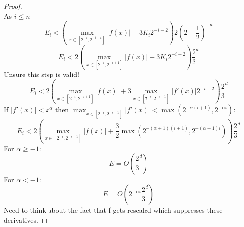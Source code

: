 \documentclass[aps]{revtex4-2}
\begin{document}
\begin{proof}
\begin{equation}
    \end{equation}
    As $i \leq n$
    \begin{equation}
        E_i < \left(\max_{x \in [2^{-i}, 2^{-i+1}]} |f(x)| + 3K_i2^{-i-2}\right) 2(2 - \frac{1}{2})^{-d}
    \end{equation}
    \begin{equation}
        E_i < 2\left(\max_{x \in [2^{-i}, 2^{-i+1}]} |f(x)| + 3K_i2^{-i-2}\right) \frac{2}{3}^{d}
    \end{equation}
    Unsure this step is valid!
        \begin{equation}
        E_i < 2\left(\max_{x \in [2^{-i}, 2^{-i+1}]} |f(x)| + 3\max_{x \in [2^{-i}, 2^{-i+1}]} |f'(x)|2^{-i-2}\right) \frac{2}{3}^{d}
    \end{equation}
    If $|f'(x)| < x^{\alpha}$ then $\max_{x \in [2^{-i}, 2^{-i+1}]} |f'(x)| < \max(2^{-\alpha(i+1)},2^{-\alpha i})$:
    \begin{equation}
        E_i < 2\left(\max_{x \in [2^{-i}, 2^{-i+1}]} |f(x)| + \frac{3}{2}\max(2^{-(\alpha+1)(i+1)},2^{-(\alpha+1)i})\right) \frac{2}{3}^{d}
    \end{equation}
    For $\alpha \geq -1$:
    \begin{equation}
        E = O(\frac{2}{3}^{d})
    \end{equation}
    For $\alpha < -1$:
    \begin{equation}
        E = O(2^{-\alpha i}\frac{2}{3}^{d})
    \end{equation}
    Need to think about the fact that f gets rescaled which suppresses these derivatives.
\end{proof}
\end{document}
